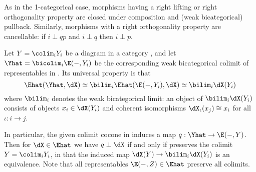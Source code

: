 

\begin{eg}\label{eg:orth-cancel}
  As in the 1-categorical case, morphisms having a right lifting or right orthogonality property are closed under composition and (weak bicategorical) pullback.
  Similarly, morphisms with a right orthogonality property are cancellable: if $i\perp qp$ and $i\perp q$ then $i\perp p$.
\end{eg}

\begin{eg}\label{eg:colim-orth}
  Let $Y = \colim_i Y_i$ be a diagram in a category \E, and let $\Yhat = \bicolim_i \E(-,Y_i)$ be the corresponding weak bicategorical colimit of representables in \Ehat.
  Its universal property is that
  \[\Ehat(\Yhat,\dX) \simeq \bilim_i \Ehat(\E(-,Y_i),\dX) \simeq \bilim_i \dX(Y_i)\]
  where $\bilim_i$ denotes the weak bicategorical limit: an object of $\bilim_i \dX(Y_i)$ consists of objects $x_i \in \dX(Y_i)$ and coherent isomorphisms $\dX_\iota(x_j) \cong x_i$ for all $\iota:i\to j$.

  In particular, the given colimit cocone in \E induces a map $q:\Yhat \to \E(-,Y)$.
  Then for $\dX\in\Ehat$ we have $q \perp \dX$ if and only if \dX preserves the colimit $Y = \colim_i Y_i$, in that the induced map $\dX(Y) \to \bilim_i \dX(Y_i)$ is an equivalence.
  Note that all representables $\E(-,Z) \in \Ehat$ preserve all colimits.
\end{eg}



